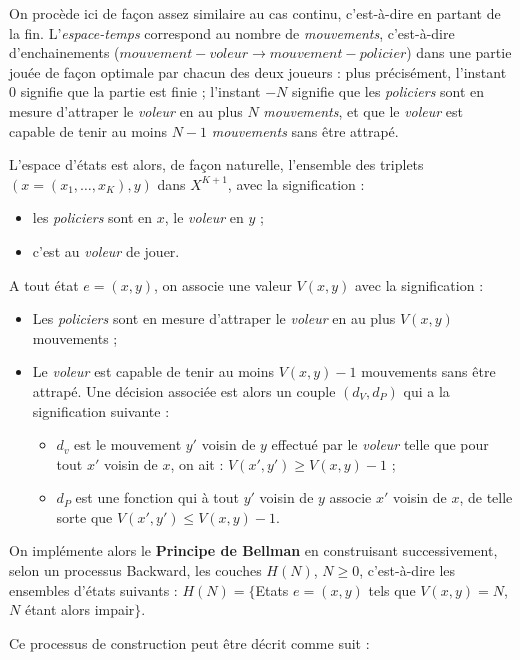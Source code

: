 {On procède ici de façon assez similaire au cas continu, c'est-à-dire 
en partant de la fin. L'\textit{espace-temps} correspond au nombre de \textit{mouvements}, c'est-à-dire d'enchainements ($mouvement-voleur \rightarrow mouvement-policier$) dans une partie jouée de façon optimale par chacun des deux joueurs : plus précisément, l'instant 0 signifie que la partie est finie ; l'instant  $- N$ signifie que les \textit{policiers} sont en mesure d'attraper le \textit{voleur} en au plus $N$ \textit{mouvements}, et que le \textit{voleur} est capable de tenir au moins $N-1$ \textit{mouvements} sans être attrapé. 

L'espace d'états est alors, de façon naturelle, l'ensemble des triplets $(x = (x_1,\dots, x_K), y)$ dans $X^{K+1}$, avec la signification : 
\begin{itemize}[label=$\square$]
	\item	les \textit{policiers} sont en $x$, le \textit{voleur} en $y$ ;
	\item	c'est au \textit{voleur} de jouer. 
\end{itemize}	
	A tout état $e =  (x, y)$, on associe une valeur $V(x, y)$ avec la signification :
	\begin{itemize}[label=$\square$]
	\item	Les \textit{policiers} sont en mesure d'attraper le \textit{voleur} en au plus $V(x, y)$ mouvements ; 
	\item	Le \textit{voleur} est capable de tenir au moins $V(x, y) - 1$  mouvements sans être attrapé. Une décision associée est alors un couple $(d_V, d_P)$ qui a la signification suivante :
	\begin{itemize}
		\item	$d_v$ est le mouvement $y'$ voisin de $y$ effectué par le \textit{voleur} telle que pour tout $x'$ voisin de $x$, on ait : $V(x', y') \geq   V(x, y) - 1$ ;  
		\item	$d_P$ est une fonction qui à tout $y'$ voisin de $y$ associe $x'$ voisin de $x$, de telle sorte que $V(x', y') \leq V(x, y) - 1$.  
	\end{itemize}

\end{itemize}
On implémente alors le \textbf{Principe de Bellman} en construisant successivement, selon un processus Backward, les couches $H(N)$, $N \geq 0$, c'est-à-dire les ensembles d'états suivants :	$H(N) = \{$Etats $e = (x, y)$ tels que $V(x, y) = N$, $N$ étant alors impair$\}$.


Ce processus de construction peut être décrit comme suit :

}
